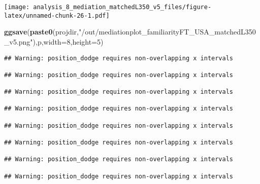 \documentclass[
]{article}
\newenvironment{Shaded}{\begin{snugshade}}{\end{snugshade}}
\newcommand{\DataTypeTok}[1]{\textcolor[rgb]{0.13,0.29,0.53}{#1}}
\newcommand{\DecValTok}[1]{\textcolor[rgb]{0.00,0.00,0.81}{#1}}
\newcommand{\KeywordTok}[1]{\textcolor[rgb]{0.13,0.29,0.53}{\textbf{#1}}}
\newcommand{\NormalTok}[1]{#1}
\newcommand{\StringTok}[1]{\textcolor[rgb]{0.31,0.60,0.02}{#1}}
\begin{document}
\texttt{[image: analysis\_8\_mediation\_matchedL350\_v5\_files/figure-latex/unnamed-chunk-26-1.pdf]}

\begin{Shaded}
\begin{Highlighting}[]
\KeywordTok{ggsave}\NormalTok{(}\KeywordTok{paste0}\NormalTok{(projdir,}\StringTok{"/out/mediationplot_familiarityFT_USA_matchedL350_v5.png"}\NormalTok{),p,}\DataTypeTok{width=}\DecValTok{8}\NormalTok{,}\DataTypeTok{height=}\DecValTok{5}\NormalTok{)}
\end{Highlighting}
\end{Shaded}

\begin{verbatim}
## Warning: position_dodge requires non-overlapping x intervals

## Warning: position_dodge requires non-overlapping x intervals

## Warning: position_dodge requires non-overlapping x intervals

## Warning: position_dodge requires non-overlapping x intervals

## Warning: position_dodge requires non-overlapping x intervals

## Warning: position_dodge requires non-overlapping x intervals

## Warning: position_dodge requires non-overlapping x intervals

## Warning: position_dodge requires non-overlapping x intervals
\end{verbatim}
\end{document}
